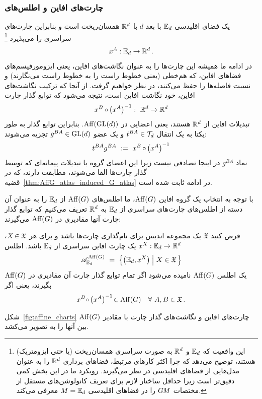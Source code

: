 \subsubsection{چارت‌های افاین و اطلس‌های }
یک فضای اقلیدسی $\mathbb{E}_d$ با بعد $d$ با $\mathbb{R}^d$ همسان‌ریخت است و بنابراین چارت‌های سراسری را می‌پذیرد%
\footnote{
	این واقعیت که $\mathbb{E}_d$ و $\mathbb{R}^d$ به صورت سراسری همسان‌ریخت (یا حتی ایزومتریک) هستند، توضیح می‌دهد که چرا اکثر کارهای مرتبط، فضاهای برداری $\mathbb{R}^d$ را به عنوان مدل‌هایی از فضاهای اقلیدسی در نظر می‌گیرند.
	رویکرد ما در این بخش کمی دقیق‌تر است زیرا حداقل ساختار لازم برای تعریف کانولوشن‌های مستقل از مختصات $G\mkern-1.4muM$ را در فضاهای اقلیدسی $M=\mathbb{E}_d$ معرفی می‌کند.
}
\begin{align}
	x^A: \mathbb{E}_d \to \mathbb{R}^d \,.
\end{align}
در ادامه ما همیشه این چارت‌ها را به عنوان نگاشت‌های افاین، یعنی ایزومورفیسم‌های فضاهای افاین، که هم‌خطی (یعنی خطوط راست را به خطوط راست می‌نگارند) و نسبت فاصله‌ها را حفظ می‌کنند، در نظر خواهیم گرفت.
از آنجا که ترکیب نگاشت‌های افاین، خود نگاشت افاین است، نتیجه می‌شود که توابع گذار چارت
\begin{align}
	x^B \mkern-1mu\circ\mkern-1mu \big(x^A \big)^{-1}:\ \mathbb{R}^d \to \mathbb{R}^d
\end{align}
تبدیلات افاین از $\mathbb{R}^d$ هستند، یعنی اعضایی در $\operatorname{Aff}(\operatorname{GL}(d))$.
بنابراین توابع گذار به طور یکتا به یک انتقال $t^{BA} \in \mathcal{T}_d$ و یک عضو $g^{BA} \in \operatorname{GL}(d)$ تجزیه می‌شوند:
\begin{align}
	t^{BA} g^{BA}\ :=\ x^B \mkern-1mu\circ\mkern-1mu \big(x^A \big)^{-1}
\end{align}
نماد $g^{BA}$ در اینجا تصادفی نیست زیرا این اعضای گروه با تبدیلات پیمانه‌ای که توسط گذار چارت‌ها القا می‌شوند، مطابقت دارند، که در قضیه~\ref{thm:AffG_atlas_induced_G_atlas} در ادامه ثابت شده است.

با توجه به انتخاب یک گروه افاین $\operatorname{Aff}(G)$، ما اطلس‌های $\operatorname{Aff}(G)$ از $\mathbb{E}_d$ را به عنوان آن دسته از اطلس‌های چارت‌های سراسری از $\mathbb{E}_d$ به $\mathbb{R}^d$ تعریف می‌کنیم که توابع گذار چارت آنها مقادیری در $\operatorname{Aff}(G)$ می‌گیرند:
\begin{dfn}
	\label{dfn:AffG_atlas}
	فرض کنید $\mathfrak{X}$ یک مجموعه اندیس برای نام‌گذاری چارت‌ها باشد و برای هر ${X \mkern-2mu\in \mathfrak{X}}$، $x^X: \mathbb{E}_d \to \mathbb{R}^d$ یک چارت افاین سراسری از $\mathbb{E}_d$ باشد.
	اطلس
	\begin{align}
		\mathscr{A}^{\Aff(G)}_{\Euc_d}\ =\ \pig\{ \big( \Euc_d, x^X \big) \;\pig|\ X\in \mathfrak{X} \,\pig\}
	\end{align}
	یک اطلس $\operatorname{Aff}(G)$ نامیده می‌شود اگر تمام توابع گذار چارت آن مقادیری در $\operatorname{Aff}(G)$ بگیرند، یعنی اگر
	\begin{align}
		x^B \mkern-3mu\circ\mkern-2mu \big(x^A\big)^{-1} \!\in \operatorname{Aff}(G) \quad \forall\ A,B \in \mathfrak{X} \,.
	\end{align}
\end{dfn}
شکل~\ref{fig:affine_charts} چارت‌های افاین و نگاشت‌های گذار چارت با مقادیر $\operatorname{Aff}(G)$ بین آنها را به تصویر می‌کشد.


